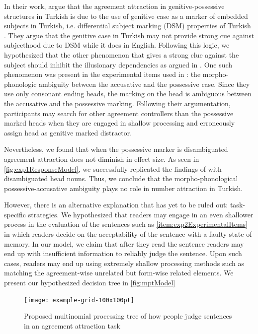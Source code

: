 \documentclass[doc,a4paper,man,natbib,floatsintext,noextraspace]{apa6}\usepackage[]{graphicx}\usepackage[]{color}
\begin{document}
In their work, \citet{LagoEtAl:2018} argue that the agreement attraction in genitive-possessive structures in Turkish is due to the use of genitive case as a marker of embedded subjects in Turkish, i.e. differential subject marking (DSM) properties of Turkish \citep{kornfilt2009dom}. They argue that the genitive case in Turkish may not provide strong cue against subjecthood due to DSM while it does in English. Following this logic, we hypothesized that the other phenomenon that gives a strong clue against the subject should inhibit the illusionary dependencies as argued in \citet{nicol2016minimal}. One such phenomenon was present in the experimental items used in \citet{LagoEtAl:2018}: the morpho-phonologic ambiguity between the accusative and the possessive case. Since they use only consonant ending heads, the marking on the head is ambiguous between the accusative and the possessive marking. Following their argumentation, participants may search for other agreement controllers than the possessive marked heads when they are engaged in shallow processing and erroneously assign head as genitive marked distractor.

Nevertheless, we found that when the possessive marker is disambiguated agreement attraction does not diminish in effect size. As seen in \autoref{fig:exp1ResponseModel}, we successfully replicated the findings of \citet{LagoEtAl:2018} with disambiguated head nouns. Thus, we conclude that the morpho-phonological possessive-accusative ambiguity plays no role in number attraction in Turkish.


However, there is an alternative explanation that has yet to be ruled out: task-specific strategies. We hypothesized that readers may engage in an even shallower process in the evaluation of the sentences such as \ref{item:exp2ExperimentalItems} in which readers decide on the acceptability of the sentence with a faulty state of memory. In our model, we claim that after they read the sentence readers may end up with insufficient information to reliably judge the sentence. Upon such cases, readers may end up using extremely shallow processing methods such as matching the agreement-wise unrelated but form-wise related elements. %
We present our hypothesized decision tree in \autoref{fig:mptModel}

\begin{figure}[h]
    \centering
    \texttt{[image: example-grid-100x100pt]} 
    \caption{Proposed multinomial processing tree of how people judge sentences in an agreement attraction task}
    \label{fig:mptModel}
\end{figure}
\end{document}
